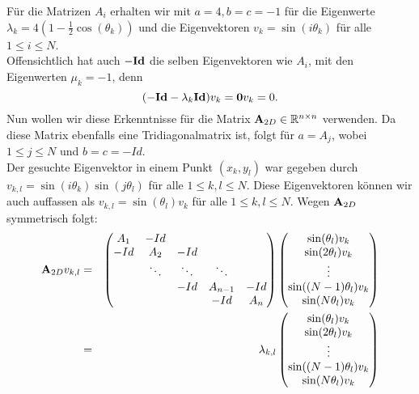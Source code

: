 Für die Matrizen $A_{i}$ erhalten wir mit $a = 4, b = c = -1$ für die Eigenwerte $\lambda_{k} = 4 (1 - \frac{1}{2} \cos(\theta_{k}))$ und die Eigenvektoren $v_{k} = \sin(i\theta_{k})$ für alle $1 \le i \le N$.\\
Offensichtlich hat auch $-{\textbf{Id}}$ die selben Eigenvektoren wie $A_{i}$, mit den Eigenwerten $\mu_{k} = -1$, denn
\begin{equation}
(-{\textbf{Id}} - \lambda_{k}{\textbf{Id}}) v_{k} = {\textbf{0}} v_{k} = 0.
\end{equation}
Nun wollen wir diese Erkenntnisse für die Matrix ${\textbf{A}}_{2D} \in \mathbb{R}^{n \times n}$ verwenden. Da diese Matrix ebenfalls eine Tridiagonalmatrix ist, folgt für $a = A_{j}$, wobei $1 \le j \le N$ und $b = c = -Id$.\\
Der gesuchte Eigenvektor in einem Punkt $(x_{k},y_{l})$ war gegeben durch $v_{k,l} = \sin(i\theta_{k}) \sin(j\theta_{l})$ für alle $1 \le k,l \le N$. Diese Eigenvektoren können wir auch auffassen als $v_{k,l} = \sin(\theta_{l})v_{k}$ für alle $1 \le k,l \le N$. Wegen ${\textbf{A}}_{2D}$ symmetrisch folgt:
\begin{eqnarray}
{\textbf{A}}_{2D}v_{k,l} &=& 
\begin{pmatrix}
A_{1} & -Id\\
-Id & A_{2} & -Id\\
    & \ddots & \ddots & \ddots\\
   	&		 & -Id    & A_{n-1} & -Id\\
   	&		 &		  & -Id    & A_{n}
\end{pmatrix}
\begin{pmatrix}
\sin(\theta_{l}) v_{k}\\
\sin(2\theta_{l}) v_{k}\\
\vdots\\
\sin((N-1)\theta_{l}) v_{k}\\
\sin(N\theta_{l}) v_{k}\\
\end{pmatrix}\notag\\
&=& \lambda_{k,l}
\begin{pmatrix}
\sin(\theta_{l}) v_{k}\\
\sin(2\theta_{l}) v_{k}\\
\vdots\\
\sin((N-1)\theta_{l}) v_{k}\\
\sin(N\theta_{l}) v_{k}\\
\end{pmatrix}\notag
\end{eqnarray}

